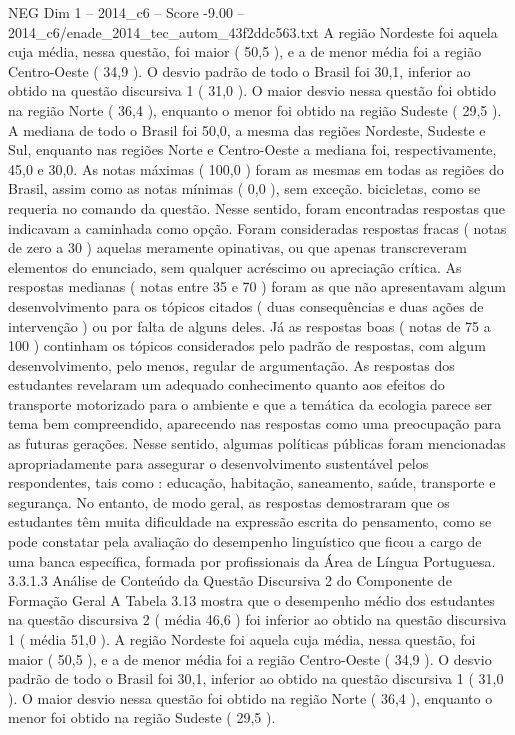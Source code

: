 \begin{textsample}{NEG Dim 1 – 2014\_c6 – Score -9.00 – 2014\_c6/enade\_2014\_tec\_autom\_43f2ddc563.txt}
A região Nordeste foi aquela cuja média, nessa questão, foi maior ( 50,5 ), e a de menor média foi a região Centro-Oeste ( 34,9 ).
O desvio padrão de todo o Brasil foi 30,1, inferior ao obtido na questão discursiva 1 ( 31,0 ).
O maior desvio nessa questão foi obtido na região Norte ( 36,4 ), enquanto o menor foi obtido na região Sudeste ( 29,5 ).
A mediana de todo o Brasil foi 50,0, a mesma das regiões Nordeste, Sudeste e Sul, enquanto nas regiões Norte e Centro-Oeste a mediana foi, respectivamente, 45,0 e 30,0.
As notas máximas ( 100,0 ) foram as mesmas em todas as regiões do Brasil, assim como as notas mínimas ( 0,0 ), sem exceção. bicicletas, como se requeria no comando da questão.
Nesse sentido, foram encontradas respostas que indicavam a caminhada como opção.
Foram consideradas respostas fracas ( notas de zero a 30 ) aquelas meramente opinativas, ou que apenas transcreveram elementos do enunciado, sem qualquer acréscimo ou apreciação crítica.
As respostas medianas ( notas entre 35 e 70 ) foram as que não apresentavam algum desenvolvimento para os tópicos citados ( duas consequências e duas ações de intervenção ) ou por falta de alguns deles.
Já as respostas boas ( notas de 75 a 100 ) continham os tópicos considerados pelo padrão de respostas, com algum desenvolvimento, pelo menos, regular de argumentação.
As respostas dos estudantes revelaram um adequado conhecimento quanto aos efeitos do transporte motorizado para o ambiente e que a temática da ecologia parece ser tema bem compreendido, aparecendo nas respostas como uma preocupação para as futuras gerações.
Nesse sentido, algumas políticas públicas foram mencionadas apropriadamente para assegurar o desenvolvimento sustentável pelos respondentes, tais como : educação, habitação, saneamento, saúde, transporte e segurança.
No entanto, de modo geral, as respostas demostraram que os estudantes têm muita dificuldade na expressão escrita do pensamento, como se pode constatar pela avaliação do desempenho linguístico que ficou a cargo de uma banca específica, formada por profissionais da Área de Língua Portuguesa. 3.3.1.3 Análise de Conteúdo da Questão Discursiva 2 do Componente de Formação Geral A Tabela 3.13 mostra que o desempenho médio dos estudantes na questão discursiva 2 ( média 46,6 ) foi inferior ao obtido na questão discursiva 1 ( média 51,0 ).
A região Nordeste foi aquela cuja média, nessa questão, foi maior ( 50,5 ), e a de menor média foi a região Centro-Oeste ( 34,9 ).
O desvio padrão de todo o Brasil foi 30,1, inferior ao obtido na questão discursiva 1 ( 31,0 ).
O maior desvio nessa questão foi obtido na região Norte ( 36,4 ), enquanto o menor foi obtido na região Sudeste ( 29,5 ).

\end{textsample}
